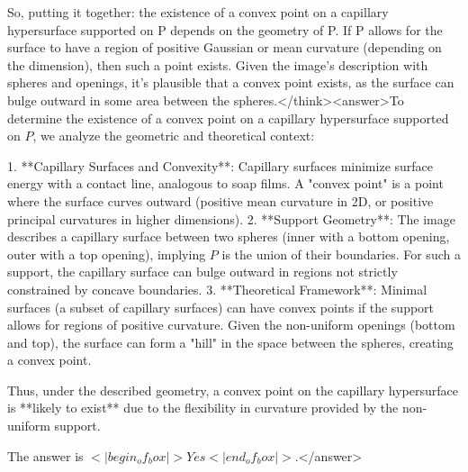So, putting it together: the existence of a convex point on a capillary hypersurface supported on P depends on the geometry of P. If P allows for the surface to have a region of positive Gaussian or mean curvature (depending on the dimension), then such a point exists. Given the image's description with spheres and openings, it's plausible that a convex point exists, as the surface can bulge outward in some area between the spheres.</think><answer>To determine the existence of a convex point on a capillary hypersurface supported on \( P \), we analyze the geometric and theoretical context:  

1. **Capillary Surfaces and Convexity**: Capillary surfaces minimize surface energy with a contact line, analogous to soap films. A "convex point" is a point where the surface curves outward (positive mean curvature in 2D, or positive principal curvatures in higher dimensions).  
2. **Support Geometry**: The image describes a capillary surface between two spheres (inner with a bottom opening, outer with a top opening), implying \( P \) is the union of their boundaries. For such a support, the capillary surface can bulge outward in regions not strictly constrained by concave boundaries.  
3. **Theoretical Framework**: Minimal surfaces (a subset of capillary surfaces) can have convex points if the support allows for regions of positive curvature. Given the non-uniform openings (bottom and top), the surface can form a "hill" in the space between the spheres, creating a convex point.  

Thus, under the described geometry, a convex point on the capillary hypersurface is **likely to exist** due to the flexibility in curvature provided by the non-uniform support.  

The answer is \(<|begin_of_box|>Yes<|end_of_box|>\).</answer>